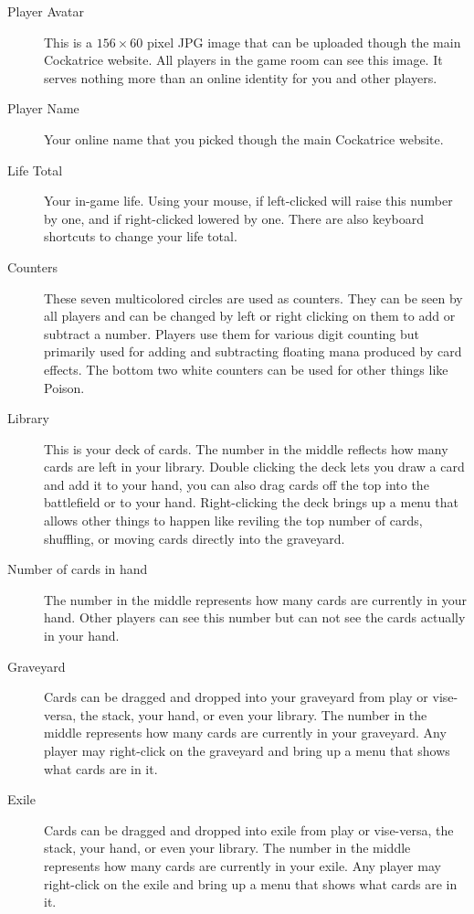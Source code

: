 \documentclass[a4paper]{scrbook}
\begin{document}
\begin{description}
 \item[Player Avatar] This is a $156\times 60$ pixel JPG image that can be uploaded though the main Cockatrice website. All players in the game room can see this image. It serves nothing more than an online identity for you and other players.
 \item[Player Name] Your online name that you picked though the main Cockatrice website.
 \item[Life Total] Your in-game life. Using your mouse, if left-clicked will raise this number by one, and if right-clicked lowered by one. There are also keyboard shortcuts to change your life total.
 \item[Counters] These seven multicolored circles are used as counters. They can be seen by all players and can be changed by left or right clicking on them to add or subtract a number. Players use them for various digit counting but primarily used for adding and subtracting floating mana produced by card effects. The bottom two white counters can be used for other things like Poison.
 \item[Library] This is your deck of cards. The number in the middle reflects how many cards are left in your library. Double clicking the deck lets you draw a card and add it to your hand, you can also drag cards off the top into the battlefield or to your hand. Right-clicking the deck brings up a menu that allows other things to happen like reviling the top number of cards, shuffling, or moving cards directly into the graveyard.
 \item[Number of cards in hand] The number in the middle represents how many cards are currently in your hand. Other players can see this number but can not see the cards actually in your hand.
 \item[Graveyard] Cards can be dragged and dropped into your graveyard from play or vise-versa, the stack, your hand, or even your library. The number in the middle represents how many cards are currently in your graveyard. Any player may right-click on the graveyard and bring up a menu that shows what cards are in it.
 \item[Exile] Cards can be dragged and dropped into exile from play or vise-versa, the stack, your hand, or even your library. The number in the middle represents how many cards are currently in your exile. Any player may right-click on the exile and bring up a menu that shows what cards are in it.
\end{description}
\end{document}
